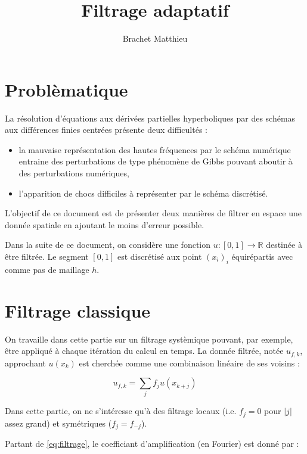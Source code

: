 \documentclass[10pt,a4paper]{article}
\author{Brachet Matthieu}
\title{Filtrage adaptatif}
\begin{document}
\maketitle

\section{Problèmatique}

La résolution d'équations aux dérivées partielles hyperboliques par des schémas aux différences finies centrées présente deux difficultés :

\begin{itemize}
\item la mauvaise représentation des hautes fréquences par le schéma numérique entraine des perturbations de type phénomène de Gibbs pouvant aboutir à des perturbations numériques,
\item l'apparition de chocs difficiles à représenter par le schéma discrétisé.
\end{itemize}

L'objectif de ce document est de présenter deux manières de filtrer en espace une donnée spatiale en ajoutant le moins d'erreur possible.

Dans la suite de ce document, on considère une fonction $u : \left[ 0, 1 \right] \rightarrow \mathbb{R}$ destinée à être filtrée. Le segment $\left[ 0, 1 \right]$ est discrétisé aux point $(x_i)_i$ équirépartis avec comme pas de maillage $h$.

\section{Filtrage classique}

On travaille dans cette partie sur un filtrage systèmique pouvant, par exemple, être appliqué à chaque itération du calcul en temps.
La donnée filtrée, notée $u_{f,k}$, approchant $u(x_k)$ est cherchée comme une combinaison linéaire de ses voisins :

\begin{equation}
u_{f,k} = \sum_j f_j u(x_{k+j}) 
\label{eq:filtrage}
\end{equation}

Dans cette partie, on ne s'intéresse qu'à des filtrage locaux (i.e. $f_j= 0$ pour $|j|$ assez grand) et symétriques ($f_j = f_{-j}$).

Partant de \eqref{eq:filtrage}, le coefficiant d'amplification (en Fourier) est donné par :
\end{document}
